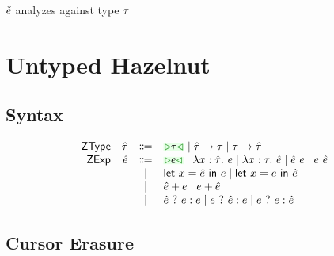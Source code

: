 \documentclass{article}
\begin{document}
\judgbox{\ctxAnaType{\ctx}{\ECMV}{\TMV}} $\ECMV$ analyzes against type $\TMV$
%
\begin{mathpar}



\end{mathpar}

\newpage
\section{Untyped Hazelnut}

\subsection{Syntax}
\[\begin{array}{rrcl}
  \ZTMName & \ZTMV & \Coloneqq & \ZTCursor{\TMV} \mid \ZTArrowL{\ZTMV}{\TMV} \mid \ZTArrowR{\TMV}{\ZTMV} \\
  \ZMName  & \ZMV  & \Coloneqq & \ZCursor{\EMV} \mid \ZLamT{x}{\ZTMV}{\EMV} \mid \ZLamE{x}{\TMV}{\ZMV} \mid \ZApL{\ZMV}{\EMV} \mid \ZApR{\EMV}{\ZMV} \\
           &       & \mid         & \ZLetL{x}{\ZMV}{\EMV} \mid \ZLetR{x}{\EMV}{\ZMV} \\
           &       & \mid         & \ZPlusL{\ZMV}{\EMV} \mid \ZPlusR{\EMV}{\ZMV} \\
           &       & \mid         & \ZIfC{\ZMV}{\EMV}{\EMV} \mid \ZIfL{\EMV}{\ZMV}{\EMV} \mid \ZIfR{\EMV}{\EMV}{\ZMV}
\end{array}\]

\subsection{Cursor Erasure}
\end{document}
